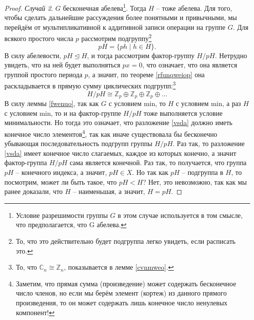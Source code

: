 \documentclass{article}
\begin{document}
\begin{proof}
    \textit{Случай 2}. $G$ бесконечная абелева\footnote{Условие разрешимости группы $G$ в этом случае используется в том смысле, что предполагается, что G абелева.}. Тогда $H$ -- тоже абелева. Для того, чтобы сделать дальнейшие рассуждения более понятными и привычными, мы перейдём от мультипликативной к аддитивной записи операции на группе $G$. Для всякого простого числа $p$ рассмотрим подгруппу\footnote{То, что это действительно будет подгруппа легко увидеть, если расписать это.} $$ pH = \{ ph \mid h \in H \}. $$
    В силу абелевости, $pH \trianglelefteq H$, и тогда рассмотрим фактор-группу $H / pH$. Нетрудно увидеть, что на ней будет выполняться $px = 0$, что означает, что она является группой простого периода $p$, а значит, по теореме \ref{rfunqweiop} она раскладывается в прямую сумму циклических подгрупп:\footnote{То, что $\mathbb{C}_n \cong \mathbb{Z}_n$, показывается в лемме \ref{cvnmweo}.}
    \begin{equation} \tag{*} \label{vsda}
        H / pH \cong \mathbb{Z}_p \oplus \mathbb{Z}_p \oplus \mathbb{Z}_p \oplus \ldots
    \end{equation}
    В силу леммы \ref{fwenuo}, так как $G$ с условием min, то $H$ с условием min, а раз $H$ с условием min, то и на фактор-группе $H / pH$ тоже выполняется условие минимальности. Но тогда это означает, что разложение \eqref{vsda} должно иметь конечное число элементов\footnote{Заметим, что прямая сумма (произведение) может содержать бесконечное число членов, но если мы берём элемент (кортеж) из данного прямого произведения, то он может содержать лишь конечное число ненулевых компонент!}, так как иначе существовала бы бесконечно убывающая последовательность подгрупп группы $H / pH$. Раз так, то разложение \eqref{vsda} имеет конечное число слагаемых, каждое из которых конечно, а значит фактор-группа $H / pH$ сама является конечной.
    Раз так, то получается, что группа $pH$ -- конечного индекса, а значит, $pH \in X$. Но так как $pH$ -- подгруппа в $H$, то посмотрим, может ли быть такое, что $pH < H$? Нет, это невозможно, так как мы ранее доказали, что $H$ -- наименьшая, а значит, $H = pH$.


\end{proof}
\end{document}

